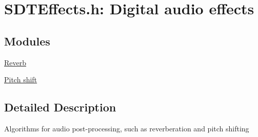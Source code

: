 \hypertarget{group__effects}{}\section{S\+D\+T\+Effects.\+h\+: Digital audio effects}
\label{group__effects}
\subsection*{Modules}
\begin{DoxyCompactItemize}
\item 
\hyperlink{group__reverb}{Reverb}
\item 
\hyperlink{group__pitchshift}{Pitch shift}
\end{DoxyCompactItemize}


\subsection{Detailed Description}
Algorithms for audio post-\/processing, such as reverberation and pitch shifting 